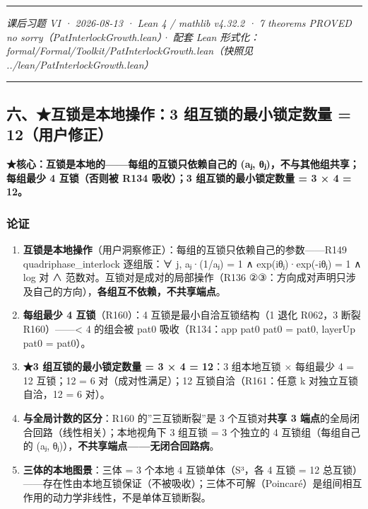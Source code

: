 \documentclass[
]{article}
\providecommand{\tightlist}{%
 \setlength{\itemsep}{0pt}\setlength{\parskip}{0pt}}
\begin{document}
\begin{center}\rule{0.5\linewidth}{0.5pt}\end{center}

\emph{课后习题 VI · 2026-08-13 · Lean 4 / mathlib v4.32.2 · 7
theorems PROVED no sorry（PatInterlockGrowth.lean）· 配套 Lean
形式化：formal/Formal/Toolkit/PatInterlockGrowth.lean（快照见
../lean/PatInterlockGrowth.lean）}

\begin{center}\rule{0.5\linewidth}{0.5pt}\end{center}

\subsection{六、★互锁是本地操作：3 组互锁的最小锁定数量 =
12（用户修正）}\label{ux516dux4e92ux9501ux662fux672cux5730ux64cdux4f5c3-ux7ec4ux4e92ux9501ux7684ux6700ux5c0fux9501ux5b9aux6570ux91cf-12ux7528ux6237ux4feeux6b63}

\textbf{★核心：互锁是本地的------每组的互锁只依赖自己的 (aⱼ,
θⱼ)，不与其他组共享；每组最少 4 互锁（否则被 R134 吸收）；3
组互锁的最小锁定数量 = 3 × 4 = 12。}

\subsubsection{论证}\label{ux8bbaux8bc1-2}

\begin{enumerate}
\def\labelenumi{\arabic{enumi}.}
\tightlist
\item
 \textbf{互锁是本地操作}（用户洞察修正）：每组的互锁只依赖自己的参数------R149
 quadriphase\_interlock 逐组版：∀ j, aⱼ·(1/aⱼ) = 1 ∧ exp(iθⱼ)·exp(-iθⱼ)
 = 1 ∧ log 对 ∧ 范数对。互锁对是成对的局部操作（R136
 ②③：方向成对声明只涉及自己的方向），\textbf{各组互不依赖，不共享端点}。
\item
 \textbf{每组最少 4 互锁}（R160）：4 互锁是最小自洽互锁结构（1 退化
 R062，3 断裂 R160）------\textless{} 4 的组会被 pat0 吸收（R134：app
 pat0 pat0 = pat0, layerUp pat0 = pat0）。
\item
 \textbf{★3 组互锁的最小锁定数量 = 3 × 4 = 12}：3 组本地互锁 × 每组最少
 4 = 12 互锁；12 = 6 对（成对性满足）；12 互锁自洽（R161：任意 k
 对独立互锁自洽，12 = 6 对）。
\item
 \textbf{与全局计数的区分}：R160 的''三互锁断裂''是 3
 个互锁对\textbf{共享 3 端点}的全局闭合回路（线性相关）；本地视角下 3
 组互锁 = 3 个独立的 4 互锁组（每组自己的 (aⱼ,
 θⱼ)），\textbf{不共享端点------无闭合回路病}。
\item
 \textbf{三体的本地图景}：三体 = 3 个本地 4 互锁单体（S³，各 4 互锁 =
 12
 总互锁）------存在性由本地互锁保证（不被吸收）；三体不可解（Poincaré）是组间相互作用的动力学非线性，不是单体互锁断裂。
\end{enumerate}
\end{document}
